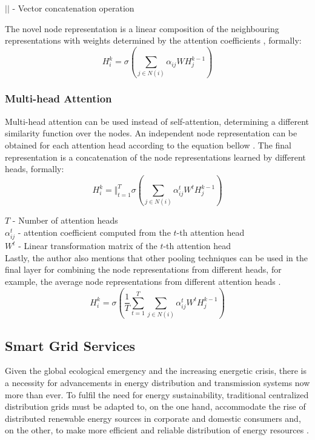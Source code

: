 \documentclass[11pt,a4paper]{article}
\begin{document}
$||$ - Vector concatenation operation

The novel node representation is a linear composition of the neighbouring representations with weights determined by the attention coefficients \cite{velickovicGraphAttentionNetworks2018, tangGraphNeuralNetworks2022}, formally:
\begin{equation}
    H^k_i = \sigma(\sum_{j \in N(i)} \alpha_{ij} W H^{k - 1}_j) 
\end{equation}
 

\subsubsection*{Multi-head Attention}

Multi-head attention can be used instead of self-attention, determining a different similarity function over the nodes. An independent node representation can be obtained for each attention head according to the equation bellow \cite{velickovicGraphAttentionNetworks2018, tangGraphNeuralNetworks2022}. The final representation is a concatenation of the node representations learned by different heads, formally:
$$ H^k_i = \Big\Vert^T_{t=1} \sigma(\sum_{j \in N(i)} \alpha^t_{ij} W^t H^{k-1}_j)$$
 
$T$ - Number of attention heads \\
$\alpha^t_{ij}$ - attention coefficient computed from the $t$-th attention head \\
$W^t$ - Linear transformation matrix of the $t$-th attention head \\

Lastly, the author also mentions that other pooling techniques can be used in the final layer for combining the node representations from different heads, for example, the average node representations from different attention heads \cite{velickovicGraphAttentionNetworks2018, tangGraphNeuralNetworks2022}.
\begin{equation}
    H^k_i = \sigma(\frac{1}{T} \sum^T_{t = 1} \sum_{j \in N(i)} \alpha^t_{ij} W^t H^{k-1}_j)
\end{equation}
 

\subsection{Smart Grid Services}

Given the global ecological emergency and the increasing energetic crisis, there is a necessity for advancements in energy distribution and transmission systems now more than ever. To fulfil the need for energy sustainability, traditional centralized distribution grids must be adapted to, on the one hand, accommodate the rise of distributed renewable energy sources in corporate and domestic consumers and, on the other, to make more efficient and reliable distribution of energy resources \cite{farhangiPathSmartGrid2010, vijayapriyaSmartGridOverview2011}. \par
\end{document}
